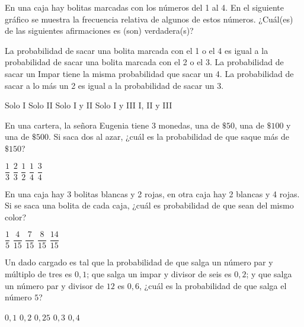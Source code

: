 \documentclass[sin nombre]{srs2}
\begin{document}
\begin{preguntas}
\pregunta En una caja hay bolitas marcadas con los números del 1 al 4. En el siguiente gráfico se muestra la frecuencia relativa de algunos de estos números. ¿Cuál(es) de las siguientes afirmaciones es (son) verdadera(s)?
\begin{opciones}
\opcion La probabilidad de sacar una bolita marcada con el 1 o el 4 es igual a la probabilidad de sacar una bolita marcada con el 2 o el 3.
\opcion La probabilidad de sacar un Impar tiene la misma probabilidad que sacar un 4.
\opcion La probabilidad de sacar a lo más un 2 es igual a la probabilidad de sacar un 3.
\end{opciones}
\begin{columnas}[0.5]
\begin{alternativas}
\alternativa Solo I
\alternativa Solo II
\alternativa Solo I y II
\alternativa Solo I y III
\alternativa I, II y III
\end{alternativas}
\siguiente
{}
\end{columnas}

\pregunta En una cartera, la señora Eugenia tiene 3 monedas, una de $\$50$, una de $\$100$ y una de $\$500$. Si saca dos al azar, ¿cuál es la probabilidad de que saque más de $\$150$?
\begin{alternativas}
\alternativa $\dfrac{1}{3}$
\alternativa $\dfrac{2}{3}$
\alternativa $\dfrac{1}{2}$
\alternativa $\dfrac{1}{4}$
\alternativa $\dfrac{3}{4}$
\end{alternativas}

\pregunta En una caja hay 3 bolitas blancas y 2 rojas, en otra caja hay 2 blancas y 4 rojas. Si se saca una bolita de cada caja, ¿cuál es probabilidad de que sean del mismo color?
\begin{alternativas}
\alternativa $\dfrac{1}{5}$
\alternativa $\dfrac{4}{15}$
\alternativa $\dfrac{7}{15}$
\alternativa $\dfrac{8}{15}$
\alternativa $\dfrac{14}{15}$
\end{alternativas}

\pregunta Un dado cargado es tal que la probabilidad de que salga un número par y múltiplo de tres es $0,1$; que salga un impar y divisor de seis es $0,2$; y que salga un número par y divisor de $12$ es $0,6$, ¿cuál es la probabilidad de que salga el número $5$?
\begin{alternativas}
\alternativa $0,1$
\alternativa $0,2$
\alternativa $0,25$
\alternativa $0,3$
\alternativa $0,4$
\end{alternativas}


\end{preguntas}
\end{document}
